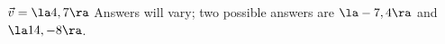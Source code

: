 {$\vec v = \la 4,7\ra$
}
{Answers will vary; two possible answers are $\la -7,4\ra$ and $\la 14,-8\ra$.
}
